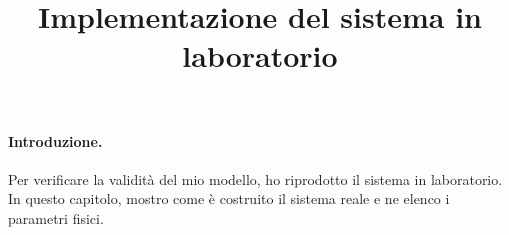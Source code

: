 \title{Implementazione del sistema in laboratorio}
\maketitle
\label{sec:pic-irl}


\paragraph{Introduzione.}
Per verificare la validità del mio modello, ho riprodotto il sistema in laboratorio.
In questo capitolo, mostro come è costruito il sistema reale e ne elenco i parametri
fisici.



